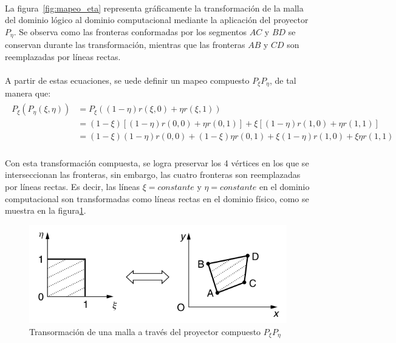 \documentclass[letterpaper, openright, 12pt]{book}
\begin{document}
    \paragraph*{}
        La figura~\ref{fig:mapeo_eta} representa gráficamente la transformación
        de la malla del dominio lógico al dominio computacional mediante la
        aplicación del proyector $P_{\eta}$. Se observa como las fronteras
        conformadas por los segmentos $AC$ y $BD$ se conservan durante las
        transformación, mientras que las fronteras $AB$ y $CD$ son reemplazadas
        por líneas rectas.
    \paragraph*{}
        A partir de estas ecuaciones, se uede definir un mapeo compuesto
        $P_{\xi}P_{\eta}$, de tal manera que:
        \begin{align}
            \begin{aligned}
                P_{\xi}(P_{\eta}(\xi, \eta)) &= P_{\xi} ((1 - \eta)r(\xi, 0) + \eta r(\xi, 1)) \\
                &= (1 - \xi) \left[ (1 - \eta)r(0, 0) + \eta r(0, 1) \right] + \xi \left[ (1 - \eta)r(1, 0) + \eta r(1,1) \right]\\
                &= (1 - \xi)(1 - \eta)r(0, 0) + (1-\xi)\eta r(0, 1) + \xi(1 - \eta)r(1, 0) + \xi\eta r(1, 1)
            \end{aligned}
        \end{align}
    \paragraph*{}
        Con esta transformación compuesta, se logra preservar los 4 vértices en
        los que se interseccionan las fronteras, sin embargo, las cuatro
        fronteras son reemplazadas por líneas rectas. Es decir, las líneas
        $\xi = constante$ y $\eta = constante$ en el dominio computacional son
        transformadas como líneas rectas en el dominio físico, como se muestra
        en la figura\ref{fig:mapeo_xieta}.
        \begin{figure}[htbp!]
            \centering
            \includegraphics[keepaspectratio, width=120mm]{./Imagenes/mapeo_xieta}
            \caption[Transformación de malla por $P_{\xi}P_{\eta}$]{Transormación
            de una malla a través del proyector compuesto
            $P_{\xi}P_{\eta}$\cite{farrashkhalvat}}
            \label{fig:mapeo_xieta}
        \end{figure}
\end{document}
